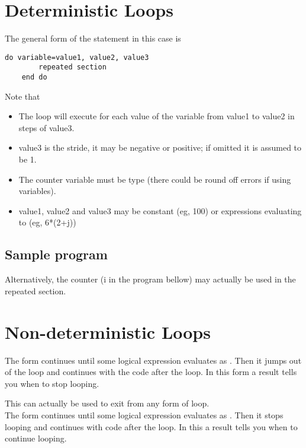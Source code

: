 \documentclass[class=book,crop=false]{standalone}
\begin{document}
\section{Deterministic  Loops}
The general form of the  statement in this case is 
\begin{lstlisting}[numbers=none]
    do variable=value1, value2, value3
        repeated section
    end do
\end{lstlisting}
Note that
\begin{itemize}
    \item The loop will execute for each value of the variable from value1 to value2 in steps of value3.
    \item value3 is the stride, it may be negative or positive; if omitted it is assumed to be 1.
    \item The counter variable must be  type (there could be round off errors if using  variables).
    \item value1, value2 and value3 may be constant (eg, 100) or expressions evaluating to  (eg, 6*(2+j))
\end{itemize}
\subsection{Sample program}

Alternatively, the counter (i in the program bellow) may actually be used in the repeated section.

\section{Non-deterministic  Loops}
The  form continues until some logical expression evaluates as . Then it jumps out of the loop and continues with the code after the loop. In this form a  result tells you when to stop looping.

This can actually be used to exit from any form of loop.\\

The  form continues until some logical expression evaluates as . Then it stops looping and continues with code after the loop. In this a  result tells you when to continue looping.\\
\end{document}
